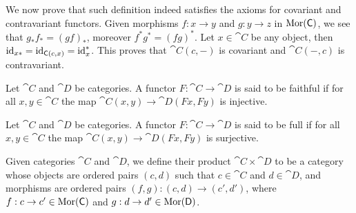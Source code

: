 We now prove that such definition indeed satisfies the axioms for covariant and
contravariant functors. Given morphisms \(f: x \to y\) and \(g: y \to z\) in
\(\operatorname{Mor}(\mathsf C)\), we see that \(g_* f_* = (g f)_*\), moreover \(f^* g^* = (f
g)^*\). Let \(x \in \cat C\) be any object, then \(\operatorname{id}_{x *} = \operatorname{id}_{\mathsf C(c,
x)} = \operatorname{id}_x^*\). This proves that \(\cat C(c, -)\) is covariant and \(\cat C(-,
c)\) is contravariant.

\begin{definition}[Faithful]\label{def: faithful}
  Let \(\cat C\) and \(\cat D\) be categories. A functor \(F: \cat C \to \cat
  D\) is said to be faithful if for all \(x, y \in \cat C\) the map \(\cat C(x,
  y) \to \cat D(F x, F y)\) is injective.
\end{definition}

\begin{definition}[Full]\label{def: full}
  Let \(\cat C\) and \(\cat D\) be categories. A functor \(F: \cat C \to \cat
  D\) is said to be full if for all \(x, y \in \cat C\) the map \(\cat C(x,
  y) \to \cat D(F x, F y)\) is surjective.
\end{definition}

\begin{definition}
  Given categories \(\cat C\) and \(\cat D\), we define their product \(\cat C
  \times \cat D\) to be a category whose objects are ordered pairs \((c, d)\)
  such that \(c \in \cat C\) and \(d \in \cat D\), and morphisms are ordered
  pairs \((f, g): (c, d) \to (c', d')\), where \(f: c \to c' \in \operatorname{Mor}(\mathsf C)\)
  and \(g: d \to d' \in \operatorname{Mor}(\mathsf D)\).
\end{definition}



